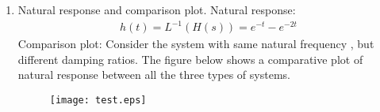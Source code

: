 \begin{enumerate}[label=\thesubsection.\arabic*.,ref=\thesubsection.\theenumi]
\item Natural response and comparison plot.
\newline
\solution Natural response:
\begin{align}
    h(t) = L^{-1}(H(s)) = e^{-t} - e^{-2t}
\end{align}
\solution Comparison plot:
\newline 
Consider the system with same natural frequency , but different damping ratios. The figure below shows a comparative plot of natural response between all the three types of systems.
\newline
\begin{figure}
\centering
\texttt{[image: test.eps]}
\end{figure}

\end{enumerate}

